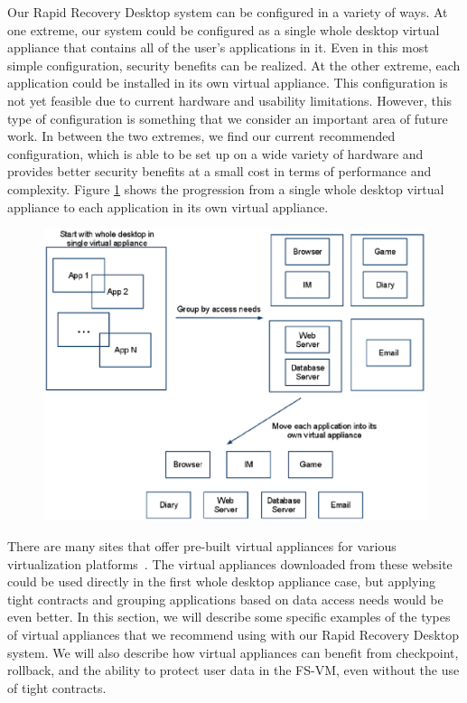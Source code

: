 Our Rapid Recovery Desktop system can be configured in a variety of ways. At one extreme, our system could be configured as a single whole desktop virtual appliance that contains all of the user's applications in it. Even in this most simple configuration, security benefits can be realized.  At the other extreme, each application could be installed in its own virtual appliance. This configuration is not yet feasible due to current hardware and usability limitations. However, this type of configuration is something that we consider an important area of future work. In between the two extremes, we find our current recommended configuration, which is able to be set up on a wide variety of hardware and provides better security benefits at a small cost in terms of performance and complexity. Figure \ref{fig:VirtualApplianceDecomposition} shows the progression from a single whole desktop virtual appliance to each application in its own virtual appliance.

\begin{figure}[tbp]
\begin{centering}
\label{fig:VirtualApplianceDecomposition}
\includegraphics[scale=1.0,angle=90]{figs/VirtualApplianceDecomposition}
\end{centering}
\end{figure}

There are many sites that offer pre-built virtual appliances for various virtualization platforms~\cite{vmware_appliances_website, rPath_website,  stacklet_website, virtual_appliances_website,  jumpbox_website}. The virtual appliances downloaded from these website could be used directly in the first whole desktop appliance case, but applying tight contracts and grouping applications based on data access needs would be even better. In this section, we will describe some specific examples of the types of virtual appliances that we recommend using with our Rapid Recovery Desktop system. We will also describe how virtual appliances can benefit from checkpoint, rollback, and the ability to protect user data in the FS-VM, even without the use of tight contracts.

